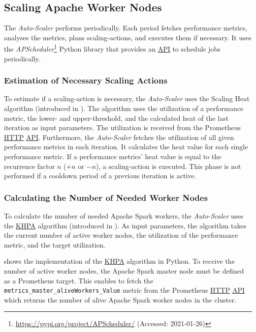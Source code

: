 \subsection{Scaling Apache Worker Nodes}
The \textit{Auto-Scaler} performs periodically. Each period fetches performance metrics, analyses the metrics, plans scaling-actions, and executes them if necessary.
It uses the \textit{APScheduler}\footnote{\url{https://pypi.org/project/APScheduler/} (Accessed: 2021-01-26)} Python library that provides an \hyperlink{abbr:api}{API} to schedule jobs periodically.


\subsubsection{Estimation of Necessary Scaling Actions}
To estimate if a scaling-action is necessary, the \textit{Auto-Scaler} uses the Scaling Heat algorithm (introduced in ).
The algorithm uses the utilization of a performance metric, the lower- and upper-threshold, and the calculated heat of the last iteration as input parameters.
The utilization is received from the Prometheus \hyperlink{abbr:http}{HTTP} \hyperlink{abbr:api}{API}. Furthermore, the \textit{Auto-Scaler} fetches the utilization of all given performance metrics in each iteration. It calculates the heat value for each single performance metric.
If a performance metrics' heat value is equal to the recurrence factor $n$ ($+n$ or $-n$), a scaling-action is executed.
This phase is not performed if a cooldown period of a previous iteration is active.


\subsubsection{Calculating the Number of Needed Worker Nodes}
To calculate the number of needed Apache Spark workers, the \textit{Auto-Scaler} uses the \hyperlink{abbr:khpa}{KHPA} algorithm (introduced in ).
As input parameters, the algorithm takes the current number of active worker nodes, the utilization of the performance metric, and the target utilization.


 shows the implementation of the \hyperlink{abbr:khpa}{KHPA} algorithm in Python.
To receive the number of active worker nodes, the Apache Spark master node must be defined as a Prometheus target. This enables to fetch the \texttt{metrics\_master\_aliveWorkers\_Value} metric from the Prometheus \hyperlink{abbr:http}{HTTP} \hyperlink{abbr:api}{API} which returns the number of alive Apache Spark worker nodes in the cluster.

